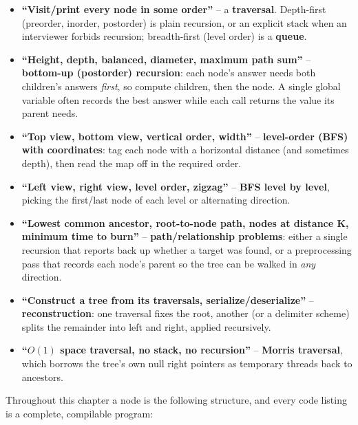 \begin{patternbox}
\begin{itemize}
  \item \textbf{``Visit/print every node in some order''} -- a
        \textbf{traversal}. Depth-first (preorder, inorder, postorder)
        is plain recursion, or an explicit stack when an interviewer
        forbids recursion; breadth-first (level order) is a
        \textbf{queue}.
  \item \textbf{``Height, depth, balanced, diameter, maximum path
        sum''} -- \textbf{bottom-up (postorder) recursion}: each node's
        answer needs both children's answers \emph{first}, so compute
        children, then the node. A single global variable often records
        the best answer while each call returns the value its parent
        needs.
  \item \textbf{``Top view, bottom view, vertical order, width''} --
        \textbf{level-order (BFS) with coordinates}: tag each node with a
        horizontal distance (and sometimes depth), then read the map off
        in the required order.
  \item \textbf{``Left view, right view, level order, zigzag''} --
        \textbf{BFS level by level}, picking the first/last node of each
        level or alternating direction.
  \item \textbf{``Lowest common ancestor, root-to-node path, nodes at
        distance K, minimum time to burn''} -- \textbf{path/relationship
        problems}: either a single recursion that reports back up whether
        a target was found, or a preprocessing pass that records each
        node's parent so the tree can be walked in \emph{any} direction.
  \item \textbf{``Construct a tree from its traversals,
        serialize/deserialize''} -- \textbf{reconstruction}: one
        traversal fixes the root, another (or a delimiter scheme) splits
        the remainder into left and right, applied recursively.
  \item \textbf{``$O(1)$ space traversal, no stack, no recursion''} --
        \textbf{Morris traversal}, which borrows the tree's own null
        right pointers as temporary threads back to ancestors.
\end{itemize}
\end{patternbox}

Throughout this chapter a node is the following structure, and every code
listing is a complete, compilable program:

